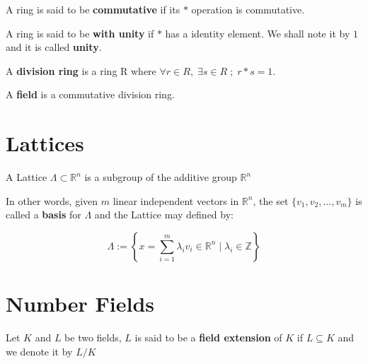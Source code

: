 \documentclass[Ingles]{ic-tese-v3}
\begin{document}
\begin{definition}
  A ring is said to be \textbf{commutative} if its $*$ operation is commutative.
\end{definition}

\begin{definition}
  A ring is said to be \textbf{with unity} if $*$ has a identity element. We
  shall note it by $1$ and it is called \textbf{unity}.
  
\end{definition}

\begin{definition}
  A \textbf{division ring} is a ring R where $\forall r \in R, \; \exists s \in R \; ; \; r*s = 1$.
\end{definition}

\begin{definition}
  A \textbf{field} is a commutative division ring.
\end{definition}

\section{Lattices}
\label{sec:lattices}

\begin{definition}
  A Lattice $\Lambda \subset \mathbb{R}^n$ is a subgroup of the additive group $\mathbb{R}^n$
\end{definition}

In other words, given $m$ linear independent vectors in $\mathbb{R}^n$, the set
$\{v_1, v_2, ..., v_m\}$ is called a \textbf{basis} for $\Lambda$ and the Lattice may defined
by:

\begin{definition}
  \begin{equation}
    \Lambda := \left\{x = \sum_{i=1}^m{\lambda_iv_i} \in \mathbb{R}^n \; | \; \lambda_i \in \mathbb{Z}\right\}
  \end{equation}
\end{definition}

\section{Number Fields}
\label{sec:number-fields}

\begin{definition}
  Let $K$ and $L$ be two fields, $L$ is said to be a \textbf{field extension} of
  $K$ if $L \subseteq K$ and we denote it by $L/K$
\end{definition}
\end{document}
